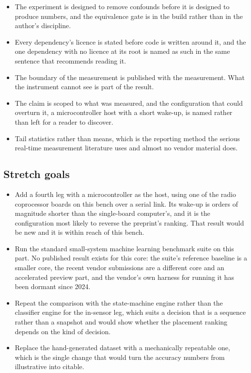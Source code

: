 \begin{itemize}
\item The experiment is designed to remove confounds before it is designed to
produce numbers, and the equivalence gate is in the build rather than in the
author's discipline.
\item Every dependency's licence is stated before code is written around it, and
the one dependency with no licence at its root is named as such in the same
sentence that recommends reading it.
\item The boundary of the measurement is published with the measurement. What
the instrument cannot see is part of the result.
\item The claim is scoped to what was measured, and the configuration that could
overturn it, a microcontroller host with a short wake-up, is named rather than
left for a reader to discover.
\item Tail statistics rather than means, which is the reporting method the
serious real-time measurement literature uses and almost no vendor material
does.
\end{itemize}

\subsection*{Stretch goals}

\begin{itemize}
\item Add a fourth leg with a microcontroller as the host, using one of the
radio coprocessor boards on this bench over a serial link. Its wake-up is orders
of magnitude shorter than the single-board computer's, and it is the
configuration most likely to reverse the preprint's ranking. That result would
be new and it is within reach of this bench.
\item Run the standard small-system machine learning benchmark suite on this
part. No published result exists for this core: the suite's reference baseline
is a smaller core, the recent vendor submissions are a different core and an
accelerated preview part, and the vendor's own harness for running it has been
dormant since 2024.
\item Repeat the comparison with the state-machine engine rather than the
classifier engine for the in-sensor leg, which suits a decision that is a
sequence rather than a snapshot and would show whether the placement ranking
depends on the kind of decision.
\item Replace the hand-generated dataset with a mechanically repeatable one,
which is the single change that would turn the accuracy numbers from
illustrative into citable.
\end{itemize}

